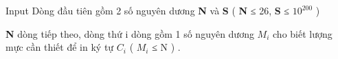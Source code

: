 Input
Dòng đầu tiên gồm 2 số nguyên dương   \textbf{    N   }   và   \textbf{    S   }   (   \textbf{    N   }   ≤ 26,   \textbf{    S   }   ≤ $10^{200}$   )  

\textbf{    N   }   dòng tiếp theo, dòng thứ i dòng gồm 1 số nguyên dương $M_{i}$   cho biết lượng mực cần thiết để in ký tự $C_{i}$   ( $M_{i}$   ≤ N ) .